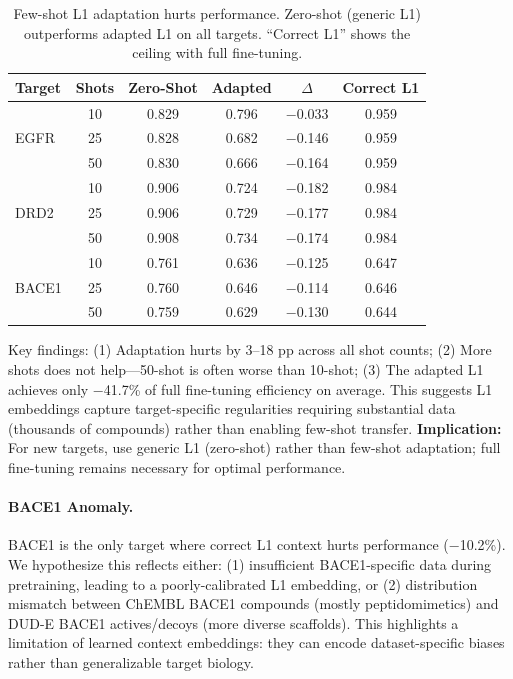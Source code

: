 \documentclass[sigconf]{acmart}
\begin{document}
\begin{table}[h]
\caption{Few-shot L1 adaptation hurts performance. Zero-shot (generic L1) outperforms adapted L1 on all targets. ``Correct L1'' shows the ceiling with full fine-tuning.}
\label{tab:fewshot}
\centering
\small
\begin{tabular}{@{}lccccc@{}}
\toprule
Target & Shots & Zero-Shot & Adapted & $\Delta$ & Correct L1 \\
\midrule
\multirow{3}{*}{EGFR} & 10 & 0.829 & 0.796 & $-$0.033 & 0.959 \\
 & 25 & 0.828 & 0.682 & $-$0.146 & 0.959 \\
 & 50 & 0.830 & 0.666 & $-$0.164 & 0.959 \\
\midrule
\multirow{3}{*}{DRD2} & 10 & 0.906 & 0.724 & $-$0.182 & 0.984 \\
 & 25 & 0.906 & 0.729 & $-$0.177 & 0.984 \\
 & 50 & 0.908 & 0.734 & $-$0.174 & 0.984 \\
\midrule
\multirow{3}{*}{BACE1} & 10 & 0.761 & 0.636 & $-$0.125 & 0.647 \\
 & 25 & 0.760 & 0.646 & $-$0.114 & 0.646 \\
 & 50 & 0.759 & 0.629 & $-$0.130 & 0.644 \\
\bottomrule
\end{tabular}
\end{table}

Key findings: (1) Adaptation hurts by 3--18 pp across all shot counts; (2) More shots does not help---50-shot is often worse than 10-shot; (3) The adapted L1 achieves only $-$41.7\% of full fine-tuning efficiency on average. This suggests L1 embeddings capture target-specific regularities requiring substantial data (thousands of compounds) rather than enabling few-shot transfer. \textbf{Implication:} For new targets, use generic L1 (zero-shot) rather than few-shot adaptation; full fine-tuning remains necessary for optimal performance.

\paragraph{BACE1 Anomaly.}
BACE1 is the only target where correct L1 context hurts performance ($-$10.2\%). We hypothesize this reflects either: (1) insufficient BACE1-specific data during pretraining, leading to a poorly-calibrated L1 embedding, or (2) distribution mismatch between ChEMBL BACE1 compounds (mostly peptidomimetics) and DUD-E BACE1 actives/decoys (more diverse scaffolds). This highlights a limitation of learned context embeddings: they can encode dataset-specific biases rather than generalizable target biology.
\end{document}
